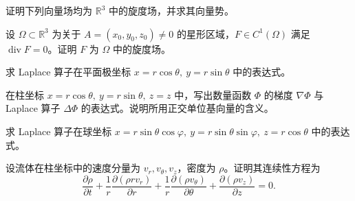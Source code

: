 \noindent\begin{minipage}{\textwidth}
证明下列向量场均为 $\mathbb R^3$ 中的旋度场，并求其向量势。
\end{minipage}\par\vfill
\noindent\begin{minipage}{\textwidth}
设 $\Omega\subset\mathbb R^3$ 为关于 $A=(x_0,y_0,z_0)\ne0$ 的星形区域，$F\in C^1(\Omega)$ 满足 $\operatorname{div}F=0$。证明 $F$ 为 $\Omega$ 中的旋度场。
\end{minipage}\par\vfill
\newpage
\noindent\begin{minipage}{\textwidth}
求 Laplace 算子在平面极坐标 $x=r\cos\theta,\ y=r\sin\theta$ 中的表达式。
\end{minipage}\par\vfill
\noindent\begin{minipage}{\textwidth}
在柱坐标 $x=r\cos\theta,\ y=r\sin\theta,\ z=z$ 中，写出数量函数 $\Phi$ 的梯度 $\nabla\Phi$ 与 Laplace 算子 $\Delta\Phi$ 的表达式。说明所用正交单位基向量的含义。
\end{minipage}\par\vfill
\noindent\begin{minipage}{\textwidth}
求 Laplace 算子在球坐标 $x=r\sin\theta\cos\varphi,\ y=r\sin\theta\sin\varphi,\ z=r\cos\theta$ 中的表达式。
\end{minipage}\par\vfill
\newpage
\noindent\begin{minipage}{\textwidth}
设流体在柱坐标中的速度分量为 $v_r,v_\theta,v_z$，密度为 $\rho$。证明其连续性方程为\[\frac{\partial\rho}{\partial t}+\frac1r\frac{\partial(\rho r v_r)}{\partial r}+\frac1r\frac{\partial(\rho v_\theta)}{\partial\theta}+\frac{\partial(\rho v_z)}{\partial z}=0.\]
\end{minipage}\par\vfill
